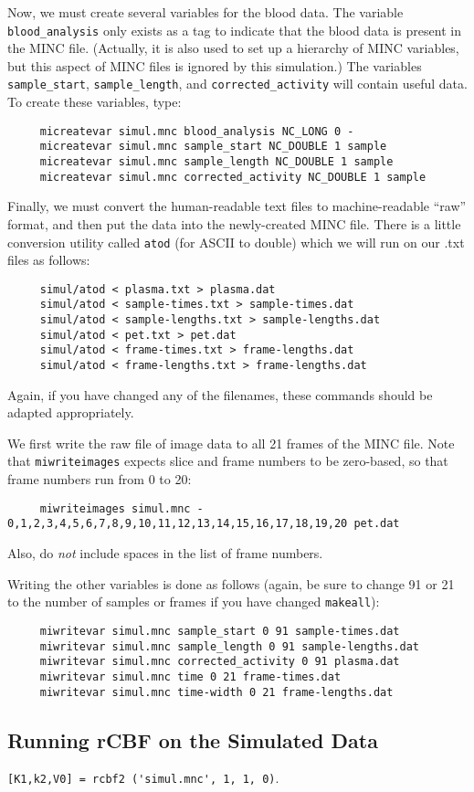 Now, we must create several variables for the blood data.  The
variable \verb|blood_analysis| only exists as a tag to indicate that
the blood data is present in the MINC file.  (Actually, it is also
used to set up a hierarchy of MINC variables, but this aspect of MINC
files is ignored by this simulation.) The variables
\verb|sample_start|, \verb|sample_length|, and
\verb|corrected_activity| will contain useful data.  To create these
variables, type:
\begin{verbatim}
     micreatevar simul.mnc blood_analysis NC_LONG 0 -
     micreatevar simul.mnc sample_start NC_DOUBLE 1 sample
     micreatevar simul.mnc sample_length NC_DOUBLE 1 sample
     micreatevar simul.mnc corrected_activity NC_DOUBLE 1 sample
\end{verbatim}

Finally, we must convert the human-readable text files to
machine-readable ``raw'' format, and then put the data into the
newly-created MINC file.  There is a little conversion utility called
\verb|atod| (for ASCII to double) which we will run on our .txt files
as follows:
\begin{verbatim}
     simul/atod < plasma.txt > plasma.dat
     simul/atod < sample-times.txt > sample-times.dat
     simul/atod < sample-lengths.txt > sample-lengths.dat
     simul/atod < pet.txt > pet.dat
     simul/atod < frame-times.txt > frame-lengths.dat
     simul/atod < frame-lengths.txt > frame-lengths.dat
\end{verbatim}
Again, if you have changed any of the filenames, these commands should
be adapted appropriately.

We first write the raw file of image data to all 21 frames of the MINC
file.  Note that \verb|miwriteimages| expects slice and frame numbers
to be zero-based, so that frame numbers run from 0 to 20:
\begin{verbatim}
     miwriteimages simul.mnc - 0,1,2,3,4,5,6,7,8,9,10,11,12,13,14,15,16,17,18,19,20 pet.dat
\end{verbatim}
Also, do {\em not} include spaces in the list of frame numbers.

Writing the other variables is done as follows (again, be sure to
change 91 or 21 to the number of samples or frames if you have changed
\verb|makeall|):
\begin{verbatim}
     miwritevar simul.mnc sample_start 0 91 sample-times.dat
     miwritevar simul.mnc sample_length 0 91 sample-lengths.dat
     miwritevar simul.mnc corrected_activity 0 91 plasma.dat
     miwritevar simul.mnc time 0 21 frame-times.dat
     miwritevar simul.mnc time-width 0 21 frame-lengths.dat
\end{verbatim}

\subsection{Running rCBF on the Simulated Data}

\verb|[K1,k2,V0] = rcbf2 ('simul.mnc', 1, 1, 0)|.


